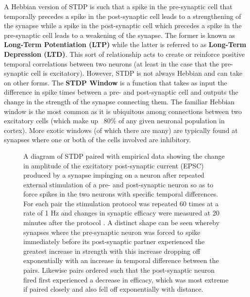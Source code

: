  A Hebbian version of STDP is such that a spike in the pre-synaptic cell that temporally precedes a spike in the post-synaptic cell leads to a strengthening of the synapse while a spike in the post-synaptic cell which precedes a spike in the pre-synaptic cell leads to a weakening of the synapse. The former is known as \textbf{Long-Term Potentiation (LTP)} while the latter is referred to as \textbf{Long-Term Depression (LTD)}. This sort of relationship acts to create or reinforce positive temporal correlations between two neurons (at least in the case that the pre-synaptic cell is excitatory). However, STDP is not always Hebbian and can take on other forms. The  \textbf{STDP Window} is a function that takes as input the difference in spike times between a pre- and post-synaptic cell and outputs the change in the strength of the synapse connecting them. The familiar Hebbian window is the most common as it is ubiquitous among connections between two excitatory cells (which make up ~80\% of any given neuronal population in cortex). More exotic windows (of which there are many) are typically found at synapses where one or both of the cells involved are inhibitory. %

\begin{figure} [h]
\centering
{}
\caption[From Bi and Poo, 1998 \cite{bi1998synaptic}]{A diagram of STDP paired with empirical data showing the change in amplitude of the excitatory post-synaptic current (EPSC) produced by a synapse impinging on a neuron after repeated external stimulation of a pre- and post-synaptic neuron so as to force spikes in the two neurons with specific temporal differences. For each pair the stimulation protocol was repeated 60 times at a rate of 1 Hz and changes in synaptic efficacy were measured at 20 minutes after the protocol  \cite{bi1998synaptic}. A distinct shape can be seen whereby synapses where the pre-synaptic neuron was forced to spike immediately before its post-synaptic partner  experienced the greatest increase in strength with this increase dropping off exponentially with an increase in temporal difference between the pairs. Likewise pairs ordered such that the post-synaptic neuron fired first experienced a decrease in efficacy, which was most extreme if paired closely and also fell off exponentially with distance.}
\label{STDP_intro}
\end{figure}
